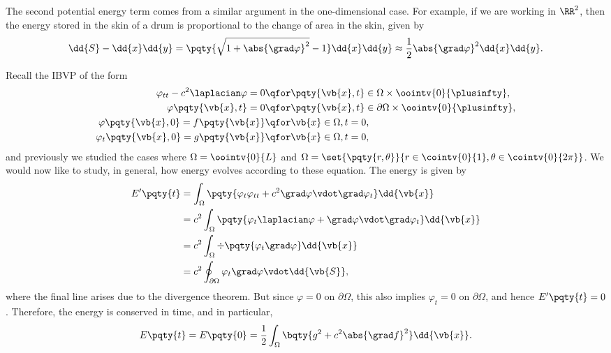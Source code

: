 {The second potential energy term comes from a similar argument in the one-dimensional case. For example, if we are working in \(\RR^2\), then the energy stored in the skin of a drum is proportional to the change of area in the skin, given by
\begin{equation}
    \dd{S} - \dd{x} \dd{y} = \pqty{\sqrt{1 + \abs{\grad \varphi}^2} - 1} \dd{x} \dd{y} \approx \frac{1}{2} \abs{\grad \varphi}^2 \dd{x} \dd{y}.
\end{equation}

Recall the IBVP of the form
\begin{subequations}
    \label{eq:wave-equation-ibvp}%
    \begin{align}
        \varphi_{tt} - c^2 \laplacian \varphi = 0 & \qfor \pqty{\vb{x}, t} \in \Omega \times \oointv{0}{\plusinfty}, \\
        \varphi\pqty{\vb{x}, t} = 0 &\qfor \pqty{\vb{x}, t} \in \partial \Omega \times \oointv{0}{\plusinfty}, \\
        \varphi\pqty{\vb{x}, 0} = f\pqty{\vb{x}} &\qfor \vb{x} \in \Omega, t = 0, \\
        \varphi_t\pqty{\vb{x}, 0} = g\pqty{\vb{x}} &\qfor \vb{x} \in \Omega, t = 0,
    \end{align}
\end{subequations}
and previously we studied the cases where \(\Omega = \oointv{0}{L}\) and \(\Omega = \set{\pqty{r, \theta}}{r \in \cointv{0}{1}, \theta \in \cointv{0}{2 \pi}}\). We would now like to study, in general, how energy evolves according to these equation. The energy is given by
\begin{subequations}
    \begin{align}
        E'\pqty{t} &= \int_{\Omega} \pqty{\varphi_t \varphi_{tt} + c^2 \grad \varphi \vdot \grad \varphi_t} \dd{\vb{x}} \\
        &= c^2 \int_{\Omega} \pqty{\varphi_t \laplacian \varphi + \grad \varphi \vdot \grad \varphi_t} \dd{\vb{x}} \\
        &= c^2 \int_{\Omega} \div \pqty{\varphi_t \grad \varphi} \dd{\vb{x}} \\
        &= c^2 \oint_{\partial \Omega} \varphi_t \grad \varphi \vdot \dd{\vb{S}},\\
    \end{align}
\end{subequations}
where the final line arises due to the divergence theorem. But since \(\varphi = 0\) on \(\partial \Omega\), this also implies \(\varphi_t = 0\) on \(\partial \Omega\), and hence \(E'\pqty{t} = 0\). Therefore, the energy is conserved in time, and in particular,
\[
    E\pqty{t} = E\pqty{0} = \frac{1}{2} \int_{\Omega} \bqty{g^2 + c^2 \abs{\grad f}^2} \dd{\vb{x}}.
\]

}
